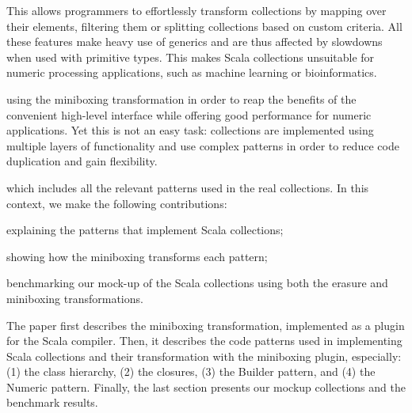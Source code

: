  This allows programmers to effortlessly transform collections by mapping over their elements, filtering them or splitting collections based on custom criteria. All these features make heavy use of generics and are thus affected by slowdowns when used with primitive types. This makes Scala collections unsuitable for numeric processing applications, such as machine learning or bioinformatics.

 using the miniboxing transformation in order to reap the benefits of the convenient high-level interface while offering good performance for numeric applications. Yet this is not an easy task: collections are implemented using multiple layers of functionality and use complex patterns in order to reduce code duplication and gain flexibility.

 which includes all the relevant patterns used in the real collections. In this context, we make the following contributions:

\begin{packed_item}
\item explaining the patterns that implement Scala collections;
\item showing how the miniboxing transforms each pattern;
\item benchmarking our mock-up of the Scala collections using both the erasure and miniboxing transformations.
\end{packed_item}

The paper first describes the miniboxing transformation, implemented as a plugin for the Scala compiler. Then, it describes the code patterns used in implementing Scala collections and their transformation with the miniboxing plugin, especially: (1) the class hierarchy, (2) the closures, (3) the Builder pattern, and (4) the Numeric pattern. Finally, the last section presents our mockup collections and the benchmark results.